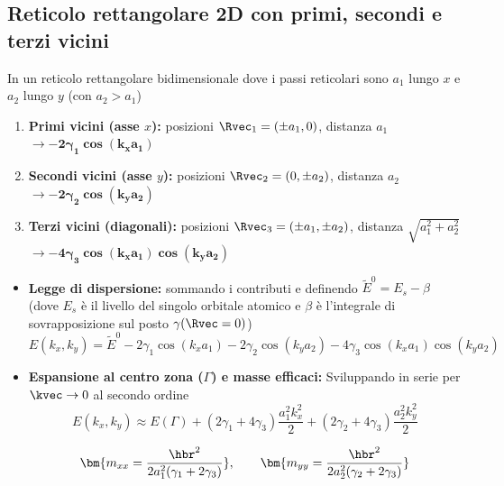 \subsection{Reticolo rettangolare 2D con primi, secondi e terzi vicini}
In un reticolo rettangolare bidimensionale dove i passi reticolari sono $a_1$ lungo $x$ e $a_2$ lungo $y$ (con $a_2 > a_1$) 
\begin{enumerate}
    \item \textbf{Primi vicini (asse $x$):} posizioni $\Rvec_1 = (\pm a_1, 0)$, distanza $a_1$ $ \rightarrow \bm{-2\gamma_1\cos(k_x a_1)} $ 
    \item \textbf{Secondi vicini (asse $y$):} posizioni $\Rvec_2 = (0, \pm a_2)$, distanza $a_2$ $  \rightarrow \bm{-2\gamma_2\cos(k_y a_2)} $  
    \item \textbf{Terzi vicini (diagonali):} posizioni $\Rvec_3 = (\pm a_1, \pm a_2)$, distanza $\sqrt{a_1^2+a_2^2}$ $  \rightarrow \bm{-4\gamma_3\cos(k_x a_1)\cos(k_y a_2)} $ 
\end{enumerate}

\begin{itemize}
    \setlength{\itemsep}{1pt}
    \item \textbf{Legge di dispersione:} sommando i contributi e definendo $\tilde E^0 = E_s - \beta$ (dove $E_s$ è il livello del singolo orbitale atomico e $\beta$ è l'integrale di sovrapposizione sul posto $\gamma(\Rvec=0)$) 
    \[ E(k_x,k_y) = \tilde E^0 - 2\gamma_1\cos(k_xa_1) - 2\gamma_2\cos(k_ya_2) - 4\gamma_3\cos(k_xa_1)\cos(k_ya_2) \] 
    
    \item \textbf{Espansione al centro zona ($\Gamma$) e masse efficaci:} 
    Sviluppando in serie per $\kvec \to 0$ al secondo ordine 
    \[ E(k_x,k_y) \approx E(\Gamma) + (2\gamma_1+4\gamma_3)\frac{a_1^2k_x^2}{2} + (2\gamma_2+4\gamma_3)\frac{a_2^2k_y^2}{2} \] 

    \[ \bm{m_{xx} = \frac{\hbr^2}{2a_1^2(\gamma_1+2\gamma_3)}}, \qquad \bm{m_{yy} = \frac{\hbr^2}{2a_2^2(\gamma_2+2\gamma_3)}} \] 
\end{itemize}


